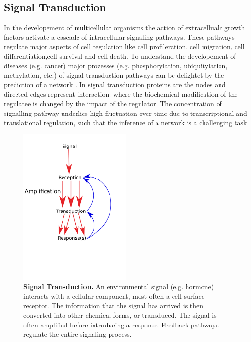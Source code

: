 \subsection*{Signal Transduction}

In the developement of multicellular organisms the action of extracellualr growth factors activate a cascade of intracellular signaling pathways. These pathways regulate major aspects of cell regulation like cell profileration, cell migration, cell differentiation,cell survival and cell death. To understand the developement of diseases (e.g. cancer) major prozesses (e.g. phosphorylation, ubiquitylation, methylation, etc.) of signal transduction pathways can be delightet by the prediction of a network . In signal transduction proteins are the nodes and directed edges represent interaction, where the biochemical modification of the regulatee is changed by the impact of the regulator. The concentration of signalling pathway underlies high fluctuation over time due to transcriptional and translational regulation, such that the inference of a network is a challenging task \citep{BIES:BIES20834}


\begin{figure}[H]
\centering
\includegraphics[width=0.5\textwidth]{./Bilder/signaltransduction.pdf}
\setlength{\abovecaptionskip}{-10ex}
\caption[Signal Transduction]{\textbf{Signal Transduction.} An environmental signal (e.g. hormone) interacts with a cellular component, most often a cell-surface receptor. The information that the signal has arrived is then converted into other chemical forms, or transduced. The signal is often amplified before introducing a response. Feedback pathways regulate the entire signaling process.\citep{Berg JM, Tymoczko JL, Stryer L. Biochemistry. 5th edition. New York: W H Freeman; 2002. Chapter 15, Signal-Transduction Pathways: An Introduction to Information Metabolism. Available from: https://www.ncbi.nlm.nih.gov/books/NBK21205/} }
\label{fig:Fig.1.}
\end{figure}

